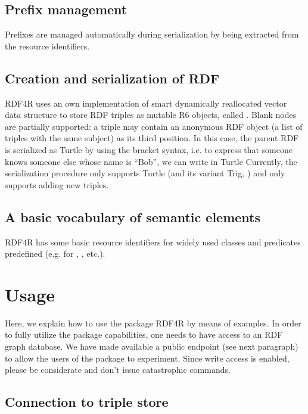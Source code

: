 \subsection{Prefix management}

Prefixes are managed automatically during serialization by being extracted from the resource identifiers.

\subsection{Creation and serialization of RDF}

RDF4R uses an own implementation of smart dynamically reallocated vector data structure to store RDF triples as mutable R6 objects, called . Blank nodes are partially supported: a triple may contain an anonymous RDF object (a list of triples with the same subject) as its third position. In this case, the parent RDF is serialized as Turtle by using the bracket syntax, i.e. to express that someone knows someone else whose name is ``Bob'', we can write in Turtle  Currently, the serialization procedure only supports Turtle (and its variant Trig, \cite{bizer_rdf_2014}) and only supports adding new triples.

\subsection{A basic vocabulary of semantic elements}

RDF4R has some basic resource identifiers for widely used classes and predicates predefined (e.g. for , , etc.).

\section{Usage}

Here, we explain how to use the package RDF4R by means of examples. In order to fully utilize the package capabilities, one needs to have access to an RDF graph database. We have made available a public endpoint (see next paragraph) to allow the users of the package to experiment. Since write access is enabled, please be considerate and don't issue catastrophic commands.

\subsection{Connection to triple store}

